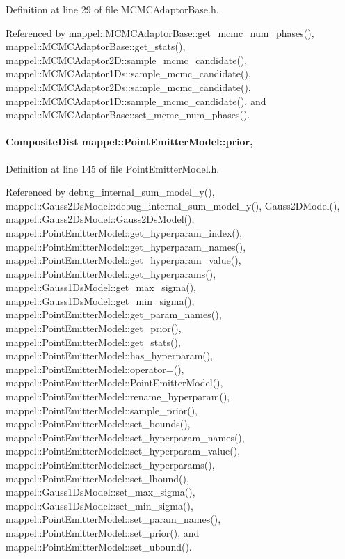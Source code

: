 Definition at line 29 of file M\+C\+M\+C\+Adaptor\+Base.\+h.



Referenced by mappel\+::\+M\+C\+M\+C\+Adaptor\+Base\+::get\+\_\+mcmc\+\_\+num\+\_\+phases(), mappel\+::\+M\+C\+M\+C\+Adaptor\+Base\+::get\+\_\+stats(), mappel\+::\+M\+C\+M\+C\+Adaptor2\+D\+::sample\+\_\+mcmc\+\_\+candidate(), mappel\+::\+M\+C\+M\+C\+Adaptor1\+Ds\+::sample\+\_\+mcmc\+\_\+candidate(), mappel\+::\+M\+C\+M\+C\+Adaptor2\+Ds\+::sample\+\_\+mcmc\+\_\+candidate(), mappel\+::\+M\+C\+M\+C\+Adaptor1\+D\+::sample\+\_\+mcmc\+\_\+candidate(), and mappel\+::\+M\+C\+M\+C\+Adaptor\+Base\+::set\+\_\+mcmc\+\_\+num\+\_\+phases().

\paragraph[{\texorpdfstring{prior}{prior}}]{\setlength{\rightskip}{0pt plus 5cm}Composite\+Dist mappel\+::\+Point\+Emitter\+Model\+::prior\hspace{0.3cm}{\ttfamily [protected]}, {\ttfamily [inherited]}}\hypertarget{classmappel_1_1PointEmitterModel_a393839f8eb1dd3d61c9369377742ba0e}{}\label{classmappel_1_1PointEmitterModel_a393839f8eb1dd3d61c9369377742ba0e}


Definition at line 145 of file Point\+Emitter\+Model.\+h.



Referenced by debug\+\_\+internal\+\_\+sum\+\_\+model\+\_\+y(), mappel\+::\+Gauss2\+Ds\+Model\+::debug\+\_\+internal\+\_\+sum\+\_\+model\+\_\+y(), Gauss2\+D\+Model(), mappel\+::\+Gauss2\+Ds\+Model\+::\+Gauss2\+Ds\+Model(), mappel\+::\+Point\+Emitter\+Model\+::get\+\_\+hyperparam\+\_\+index(), mappel\+::\+Point\+Emitter\+Model\+::get\+\_\+hyperparam\+\_\+names(), mappel\+::\+Point\+Emitter\+Model\+::get\+\_\+hyperparam\+\_\+value(), mappel\+::\+Point\+Emitter\+Model\+::get\+\_\+hyperparams(), mappel\+::\+Gauss1\+Ds\+Model\+::get\+\_\+max\+\_\+sigma(), mappel\+::\+Gauss1\+Ds\+Model\+::get\+\_\+min\+\_\+sigma(), mappel\+::\+Point\+Emitter\+Model\+::get\+\_\+param\+\_\+names(), mappel\+::\+Point\+Emitter\+Model\+::get\+\_\+prior(), mappel\+::\+Point\+Emitter\+Model\+::get\+\_\+stats(), mappel\+::\+Point\+Emitter\+Model\+::has\+\_\+hyperparam(), mappel\+::\+Point\+Emitter\+Model\+::operator=(), mappel\+::\+Point\+Emitter\+Model\+::\+Point\+Emitter\+Model(), mappel\+::\+Point\+Emitter\+Model\+::rename\+\_\+hyperparam(), mappel\+::\+Point\+Emitter\+Model\+::sample\+\_\+prior(), mappel\+::\+Point\+Emitter\+Model\+::set\+\_\+bounds(), mappel\+::\+Point\+Emitter\+Model\+::set\+\_\+hyperparam\+\_\+names(), mappel\+::\+Point\+Emitter\+Model\+::set\+\_\+hyperparam\+\_\+value(), mappel\+::\+Point\+Emitter\+Model\+::set\+\_\+hyperparams(), mappel\+::\+Point\+Emitter\+Model\+::set\+\_\+lbound(), mappel\+::\+Gauss1\+Ds\+Model\+::set\+\_\+max\+\_\+sigma(), mappel\+::\+Gauss1\+Ds\+Model\+::set\+\_\+min\+\_\+sigma(), mappel\+::\+Point\+Emitter\+Model\+::set\+\_\+param\+\_\+names(), mappel\+::\+Point\+Emitter\+Model\+::set\+\_\+prior(), and mappel\+::\+Point\+Emitter\+Model\+::set\+\_\+ubound().

